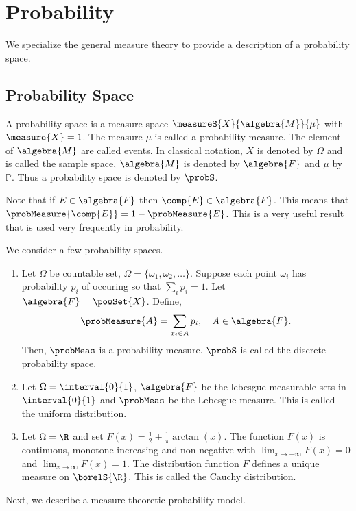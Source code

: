 \chapter{Probability}

We specialize the general measure theory to provide a description of a probability space.
\section{Probability Space}

\begin{Definition}[name=Probability space]
    A probability space  is a measure space $\measureS{X}{\algebra{M}}{\mu}$ with $\measure{X} = 1$. The
    measure $\mu$ is called a probability measure. The element of $\algebra{M}$ are called events.
    In classical notation, $X$ is denoted by $\Omega$ and is called the sample space, 
    $\algebra{M}$ is denoted by $\algebra{F}$ and
    $\mu$ by $\mathbb{P}$. Thus a probability space is denoted by $\probS$.
\end{Definition}
Note that if $E \in \algebra{F}$ then $\comp{E} \in \algebra{F}$. This means that
$\probMeasure{\comp{E}} = 1 - \probMeasure{E}$. This is a very useful result that is used very
frequently in probability.
\begin{Example}
    We consider a few probability spaces.
    \begin{enumerate}
	\item
	    Let $\Omega$ be countable set, $\Omega = \lbrace\omega_1,\omega_2,\dots\rbrace$. Suppose each
	    point $\omega_i$ has probability $p_i$ of occuring so that $\sum\limits_{i}p_i = 1$. Let
	    $\algebra{F} = \powSet{X}$. Define,
	    \[\probMeasure{A} = \sum\limits_{x_i\in A}p_i,\quad A\in\algebra{F}.\]
	    Then, $\probMeas$ is a probability measure. $\probS$ is called
	    the discrete probability space.
	\item
	    Let $\Omega = \interval{0}{1}$, $\algebra{F}$ be the lebesgue measurable sets in
	    $\interval{0}{1}$ and $\probMeas$ be the Lebesgue measure. This is called the uniform
	    distribution. 
	\item
	    Let $\Omega = \R$ and set $F(x) = \frac{1}{2} + \frac{1}{\pi}\arctan(x)$. The function
	    $F(x)$ is continuous, monotone increasing and non-negative with 
	    $\lim_{x\to-\infty}F(x) = 0$ and  $\lim_{x\to\infty}F(x) = 1$. The distribution function
	    $F$ defines a unique measure on $\borelS{\R}$. This is called the Cauchy distribution.
    \end{enumerate}
\end{Example}
Next, we describe a measure theoretic probability model.

